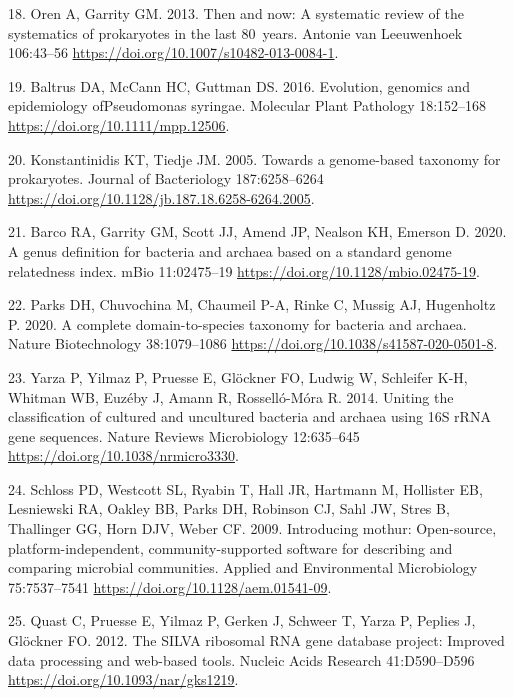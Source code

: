 \documentclass[
]{article}
\newenvironment{cslreferences}%
  {}%
  {\par}
\begin{document}
\begin{cslreferences}
\leavevmode\hypertarget{ref-Oren2013}{}%
18. Oren A, Garrity GM. 2013. Then and now: A systematic review of the
systematics of prokaryotes in the last 80~years. Antonie van Leeuwenhoek
106:43--56 \url{https://doi.org/10.1007/s10482-013-0084-1}.

\leavevmode\hypertarget{ref-Baltrus2016}{}%
19. Baltrus DA, McCann HC, Guttman DS. 2016. Evolution, genomics and
epidemiology ofPseudomonas syringae. Molecular Plant Pathology
18:152--168 \url{https://doi.org/10.1111/mpp.12506}.

\leavevmode\hypertarget{ref-Konstantinidis2005}{}%
20. Konstantinidis KT, Tiedje JM. 2005. Towards a genome-based taxonomy
for prokaryotes. Journal of Bacteriology 187:6258--6264
\url{https://doi.org/10.1128/jb.187.18.6258-6264.2005}.

\leavevmode\hypertarget{ref-Barco2020}{}%
21. Barco RA, Garrity GM, Scott JJ, Amend JP, Nealson KH, Emerson D.
2020. A genus definition for bacteria and archaea based on a standard
genome relatedness index. mBio 11:02475--19
\url{https://doi.org/10.1128/mbio.02475-19}.

\leavevmode\hypertarget{ref-Parks2020}{}%
22. Parks DH, Chuvochina M, Chaumeil P-A, Rinke C, Mussig AJ, Hugenholtz
P. 2020. A complete domain-to-species taxonomy for bacteria and archaea.
Nature Biotechnology 38:1079--1086
\url{https://doi.org/10.1038/s41587-020-0501-8}.

\leavevmode\hypertarget{ref-Yarza2014}{}%
23. Yarza P, Yilmaz P, Pruesse E, Glöckner FO, Ludwig W, Schleifer K-H,
Whitman WB, Euzéby J, Amann R, Rosselló-Móra R. 2014. Uniting the
classification of cultured and uncultured bacteria and archaea using 16S
rRNA gene sequences. Nature Reviews Microbiology 12:635--645
\url{https://doi.org/10.1038/nrmicro3330}.

\leavevmode\hypertarget{ref-Schloss2009}{}%
24. Schloss PD, Westcott SL, Ryabin T, Hall JR, Hartmann M, Hollister
EB, Lesniewski RA, Oakley BB, Parks DH, Robinson CJ, Sahl JW, Stres B,
Thallinger GG, Horn DJV, Weber CF. 2009. Introducing mothur:
Open-source, platform-independent, community-supported software for
describing and comparing microbial communities. Applied and
Environmental Microbiology 75:7537--7541
\url{https://doi.org/10.1128/aem.01541-09}.

\leavevmode\hypertarget{ref-Quast2012}{}%
25. Quast C, Pruesse E, Yilmaz P, Gerken J, Schweer T, Yarza P, Peplies
J, Glöckner FO. 2012. The SILVA ribosomal RNA gene database project:
Improved data processing and web-based tools. Nucleic Acids Research
41:D590--D596 \url{https://doi.org/10.1093/nar/gks1219}.
\end{cslreferences}
\end{document}
